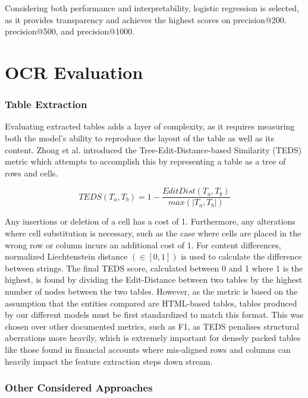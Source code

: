 \documentclass[ %
                    author={Natchalin Iwsakul \\[0.4em] Inkaphol Siriwongwattana \\[0.4em] Tanaphan Kummaraphat \\[0.6em] Patorn Srisupap},,
                supervisor={Fernando Moreno-Pino},
                    degree={MSc},
                     title={Propensity Modelling for SME Commercial Lending Using Open Public Data
},
                  subtitle={Companies House and GDELT as predictors of first-time borrowing},
                      type={},
                      year={2026}]{dissertation}
\begin{document}
Considering both performance and interpretability, logistic regression is selected, as it provides transparency and achieves the highest scores on precision@200, precision@500, and precision@1000.






\section{OCR Evaluation}

\subsubsection{Table Extraction}
\label{sec:evaluation_table_extraction}
Evaluating extracted tables adds a layer of complexity, as it requires measuring both the model's ability to reproduce the layout of the table as well as its content. Zhong et al. \cite{zhong_2020} introduced the Tree-Edit-Distance-based Similarity (TEDS) metric which attempts to accomplish this by representing a table as a tree of rows and cells.

$$ TEDS(T_a,T_b)= 1-\frac{EditDist(T_a,T_b)}{max(|T_a,T_b|)}$$

Any insertions or deletion of a cell has a cost of 1. Furthermore, any alterations where cell substitution is necessary, such as the case where cells are placed in the wrong row or column incurs an additional cost of 1. For content differences, normalized Liechtenstein distance $(\in[0,1])$ \cite{levenshtein_1966} is used to calculate the difference between strings. The final TEDS score, calculated between 0 and 1 where 1 is the highest, is found by dividing the Edit-Distance between two tables by the highest number of nodes between the two tables. However, as the metric is based on the assumption that the entities compared are HTML-based tables, tables produced by our different models must be first standardized to match this format. This was chosen over other documented metrics, such as F1, as TEDS penalises structural aberrations more heavily, which is extremely important for densely packed tables like those found in financial accounts where mis-aligned rows and columns can heavily impact the feature extraction steps down stream.

\subsubsection{Other Considered Approaches}
\end{document}
